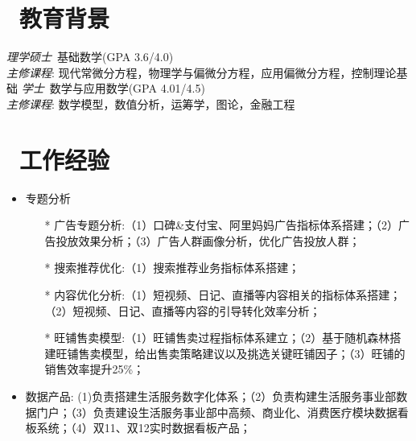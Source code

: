 \documentclass{resume}
\begin{document}


 
\section{\faGraduationCap\  教育背景}
\textit{理学硕士}\ 基础数学(GPA 3.6/4.0)\\
\textit{主修课程}:
现代常微分方程，物理学与偏微分方程，应用偏微分方程，控制理论基础
\textit{学士}\ 数学与应用数学(GPA 4.01/4.5)\\
\textit{主修课程}:
数学模型，数值分析，运筹学，图论，金融工程

\section{\faUsers\ 工作经验}
\role{资深数据分析师}{}
\begin{onehalfspacing}
  \begin{itemize}
    \item 专题分析
    \begin{itemize}
      \item[*] 广告专题分析:（1）口碑\&支付宝、阿里妈妈广告指标体系搭建；（2）广告投放效果分析；（3）广告人群画像分析，优化广告投放人群；
      \item[*] 搜索推荐优化:（1）搜索推荐业务指标体系搭建；
      \item[*] 内容优化分析:（1）短视频、日记、直播等内容相关的指标体系搭建；（2）短视频、日记、直播等内容的引导转化效率分析；
      \item[*] 旺铺售卖模型:（1）旺铺售卖过程指标体系建立；（2）基于随机森林搭建旺铺售卖模型，给出售卖策略建议以及挑选关键旺铺因子；（3）旺铺的销售效率提升25\%； 
    \end{itemize}
    \item 数据产品: (1)负责搭建生活服务数字化体系；（2）负责构建生活服务事业部数据门户；（3）负责建设生活服务事业部中高频、商业化、消费医疗模块数据看板系统；（4）双11、双12实时数据看板产品；
  \end{itemize}
\end{onehalfspacing}
\end{document}
